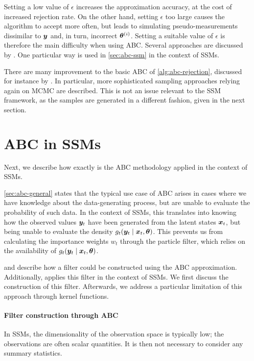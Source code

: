 Setting a low value of $\epsilon$ increases the approximation accuracy, at the cost of increased rejection rate. On the other hand, setting $\epsilon$ too large causes the algorithm to accept more often, but leads to simulating pseudo-measurements dissimilar to $\bm{y}$ and, in turn, incorrect $\bm{\theta}^{(i)}$. Setting a suitable value of $\epsilon$ is therefore the main difficulty when using ABC. Several approaches are discussed by \cite{jasra-filtering, jasra-time-series}. One particular way \citep{dedecius} is used in \autoref{sec:abc-ssm} in the context of SSMs.

There are many improvement to the basic ABC of \autoref{alg:abc-rejection}, discussed for instance by \cite{abc-recent}. In particular, more sophisticated sampling approaches relying again on MCMC are described. This is not an issue relevant to the SSM framework, as the samples are generated in a different fashion, given in the next section.

\section{ABC in SSMs} \label{sec:abc-ssm}
Next, we describe how exactly is the ABC methodology applied in the context of SSMs.

\autoref{sec:abc-general} states that the typical use case of ABC arises in cases where we have knowledge about the data-generating process, but are unable to evaluate the probability of such data. In the context of SSMs, this translates into knowing how the observed values $\bm{y}_t$ have been generated from the latent states $\bm{x}_t$, but being unable to evaluate the density $g_t(\bm{y}_t \mid \bm{x}_t, \bm{\theta})$. This prevents us from calculating the importance weights $w_t$ through the particle filter, which relies on the availability of $g_t(\bm{y}_t \mid \bm{x}_t, \bm{\theta})$.

\cite{tina-toni} and \cite{jasra-filtering} describe how a filter could be constructed using the ABC approximation. Additionally, \cite{jasra-time-series} applies this filter in the context of SSMs. We first discuss the construction of this filter. Afterwards, we address a particular limitation of this approach through kernel functions.

\paragraph{Filter construction through ABC}
In SSMs, the dimensionality of the observation space is typically low; the observations are often scalar quantities. It is then not necessary to consider any summary statistics.

